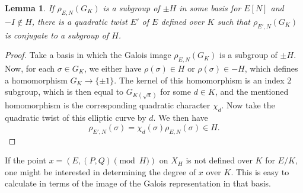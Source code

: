\documentclass[10pt,leqno]{amsart}
\newtheorem{lemma}[theorem]{Lemma}
\theoremstyle{definition}
\theoremstyle{remark}
\numberwithin{theorem}{section}
\begin{document}


\begin{lemma}
    If $\rho_{E,N}(G_K)$ is a subgroup of $\pm H$ in some basis for $E[N]$ and $-I \not \in H$, there is a quadratic twist $E'$ of $E$ defined over $K$ such that $\rho_{E', N}(G_K)$ is conjugate to a subgroup of $H$. 
\end{lemma}
\begin{proof}
Take a basis in which the Galois image $\rho_{E,N}(G_K)$ is a subgroup of $\pm H$. Now, for each $\sigma \in G_K$, we either have $\rho(\sigma) \in H$ or $\rho(\sigma) \in -H$, which defines a homomorphism $G_K \to \{\pm 1\}$. The kernel of this homomorphism is an index $2$ subgroup, which is then equal to $G_{K(\sqrt d)}$ for some $d \in K$, and the mentioned homomorphism is the corresponding quadratic character $\chi_d$. Now take the quadratic twist of this elliptic curve by $d$. We then have $$\rho_{E', N}(\sigma)=\chi_d(\sigma)\rho_{E, N}(\sigma) \in H.$$
\end{proof}

If the point $x=(E, (P,Q) \pmod H)$ on $X_H$ is not defined over $K$ for $E/K$, one might be interested in determining the degree of $x$ over $K$. This is easy to calculate in terms of the image of the Galois representation in that basis.
\end{document}

